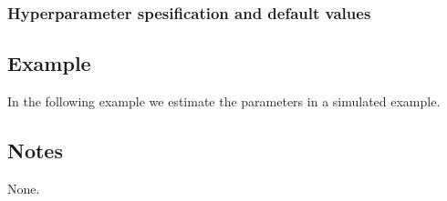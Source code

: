 \documentclass[a4paper,11pt]{article}
\begin{document}
\subsubsection*{Hyperparameter spesification and default values}

 
 
\subsection*{Example}

In the following example we estimate the parameters in a simulated
example.

 
\subsection*{Notes}
 
 None.
\end{document}

